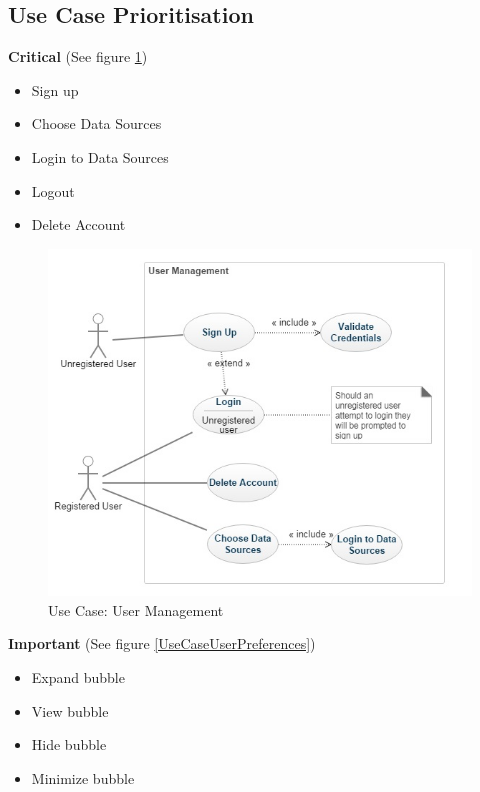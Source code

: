 \documentclass[hidelinks,english]{article}
\begin{document}
		\subsection{Use Case Prioritisation}
			\textbf{Critical} (See figure \ref{UseCaseUserManagement})
			\begin{itemize}
			    \item Sign up
			    \item Choose Data Sources
			    \item Login to Data Sources
			    \item Logout
			    \item Delete Account
			\end{itemize}
			\begin{figure}[!h]
				\includegraphics[width=\linewidth]{UserManagement.jpg}
				\caption{Use Case: User Management}
				\label{UseCaseUserManagement}
			\end{figure}
			\textbf{Important} (See figure \ref{UseCaseUserPreferences})
			\begin{itemize}
			    \item Expand bubble
			   	\item View bubble
			    \item Hide bubble
			    \item Minimize bubble
			\end{itemize}
\end{document}
